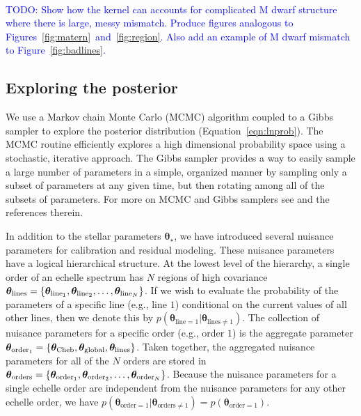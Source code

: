 \documentclass[preprint]{aastex} %
\newcommand{\vt}{ {\bm \theta}}
\newcommand{\vtstar}{\vt_{\star}}
\newcommand{\vtcheb}{\vt_{\rm Cheb}}
\newcommand{\vtglobal}{\vt_{\rm global}}
\newcommand{\vtorder}[1]{\vt_{{\rm order}_{#1}}}
\newcommand{\vtorders}{\vt_{\rm orders}}
\newcommand{\vtline}[1]{\vt_{{\rm line}_{#1}}}
\newcommand{\vtlines}{\vt_{\rm lines}}
\newcommand{\todo}[1]{ \textcolor{Blue}{\\TODO: #1}}
\begin{document}
\todo{Show how the kernel can accounts for complicated M dwarf structure where
  there is large, messy mismatch. Produce figures analogous to Figures~\ref{fig:matern}~and~\ref{fig:region}. Also add an example of M dwarf mismatch to Figure~\ref{fig:badlines}.}

\subsection{Exploring the posterior}
\label{subsec:MCMC}
We use a Markov chain Monte Carlo (MCMC) algorithm coupled to a Gibbs sampler to explore the posterior distribution (Equation~\ref{eqn:lnprob}). The MCMC routine efficiently explores a high dimensional probability space using a stochastic, iterative approach. The Gibbs sampler provides a way to easily sample a large number of parameters in a simple, organized manner by sampling only a subset of parameters at any given time, but then rotating among all of the subsets of parameters. For more on MCMC and Gibbs samplers see \citet[ch 11]{gcs+13} and the references therein. 

In addition to the stellar parameters $\vtstar$, we have introduced several nuisance parameters for calibration and residual modeling. These nuisance parameters have a logical hierarchical structure. At the lowest level of the hierarchy, a single order of an echelle spectrum has $N$ regions of high covariance $\vtlines = \{\vtline{1}, \vtline{2}, \ldots, \vtline{N}\}$. If we wish to evaluate the probability of the parameters of a specific line (e.g., line $1$) conditional on the current values of all other lines, then we denote this by $p(\vt_{\textrm{line} = 1} | \vt_{\textrm{lines} \ne 1})$. The collection of nuisance parameters for a specific order  (e.g., order $1$) is the aggregate parameter $\vtorder{1} = \{\vtcheb, \vtglobal, \vtlines\}$. Taken together, the aggregated nuisance parameters for all of the $N$ orders are stored in $\vtorders = \{\vtorder{1}, \vtorder{2}, \ldots, \vtorder{N} \}$. Because the nuisance parameters for a single echelle order are independent from the nuisance parameters for any other echelle order, we have $p(\vt_{\textrm{order} = 1} | \vt_{\textrm{orders} \ne 1}) = p(\vt_{\textrm{order} = 1})$. 
\end{document}
